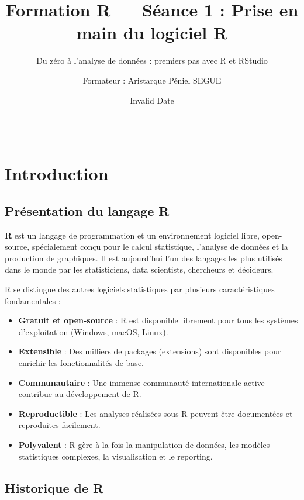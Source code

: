 \documentclass[
  french,
  11pt,
  a4paper,
]{article}
\title{Formation R --- Séance 1 : Prise en main du logiciel R}
\subtitle{Du zéro à l'analyse de données : premiers pas avec R et
RStudio}
\author{Formateur : Aristarque Péniel SEGUE}
\date{Invalid Date}
\providecommand{\tightlist}{%
  \setlength{\itemsep}{0pt}\setlength{\parskip}{0pt}}
\renewcommand*\contentsname{Table des matières}
\newcommand\contentsname{Table des matières}
\begin{document}
\maketitle

\renewcommand*\contentsname{Table des matières}
{
\setcounter{tocdepth}{3}
\tableofcontents
}

\begin{center}\rule{0.5\linewidth}{0.5pt}\end{center}

\section*{Introduction}\label{introduction}

\subsection{Présentation du langage
R}\label{pruxe9sentation-du-langage-r}

\textbf{R} est un langage de programmation et un environnement logiciel
libre, open-source, spécialement conçu pour le calcul statistique,
l'analyse de données et la production de graphiques. Il est aujourd'hui
l'un des langages les plus utilisés dans le monde par les statisticiens,
data scientists, chercheurs et décideurs.

R se distingue des autres logiciels statistiques par plusieurs
caractéristiques fondamentales :

\begin{itemize}
\tightlist
\item
  \textbf{Gratuit et open-source} : R est disponible librement pour tous
  les systèmes d'exploitation (Windows, macOS, Linux).
\item
  \textbf{Extensible} : Des milliers de packages (extensions) sont
  disponibles pour enrichir les fonctionnalités de base.
\item
  \textbf{Communautaire} : Une immense communauté internationale active
  contribue au développement de R.
\item
  \textbf{Reproductible} : Les analyses réalisées sous R peuvent être
  documentées et reproduites facilement.
\item
  \textbf{Polyvalent} : R gère à la fois la manipulation de données, les
  modèles statistiques complexes, la visualisation et le reporting.
\end{itemize}

\subsection{Historique de R}\label{historique-de-r}
\end{document}
